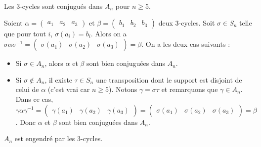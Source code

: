 




	\begin{lemma}
		\label{simplicite-du-groupe-alterne-1}
		Les $3$-cycles sont conjugués dans $A_n$ pour $n \geq 5$.
	\end{lemma}

	\begin{demonstration}
		Soient $\alpha = \begin{pmatrix} a_1 & a_2 & a_3 \end{pmatrix}$ et $\beta = \begin{pmatrix} b_1 & b_2 & b_3 \end{pmatrix}$ deux $3$-cycles. Soit $\sigma \in S_n$ telle que pour tout $i$, $\sigma(a_i) = b_i$. Alors on a $\sigma \alpha \sigma^{-1} = \begin{pmatrix} \sigma(a_1) & \sigma(a_2) & \sigma(a_3) \end{pmatrix} = \beta$. On a les deux cas suivants :
		\begin{itemize}
			\item Si $\sigma \in A_n$, alors $\alpha$ et $\beta$ sont bien conjuguées dans $A_n$.
			\item Si $\sigma \notin A_n$, il existe $\tau \in S_n$ une transposition dont le support est disjoint de celui de $\alpha$ (c'est vrai car $n \geq 5$). Notons $\gamma = \sigma \tau$ et remarquons que $\gamma \in A_n$. Dans ce cas, $\gamma \alpha \gamma^{-1} = \begin{pmatrix} \gamma(a_1) & \gamma(a_2) & \gamma(a_3) \end{pmatrix} = \begin{pmatrix} \sigma(a_1) & \sigma(a_2) & \sigma(a_3) \end{pmatrix} = \beta$. Donc $\alpha$ et $\beta$ sont bien conjuguées dans $A_n$.
		\end{itemize}
	\end{demonstration}

	\begin{lemma}
		\label{simplicite-du-groupe-alterne-2}
		$A_n$ est engendré par les $3$-cycles.
	\end{lemma}


